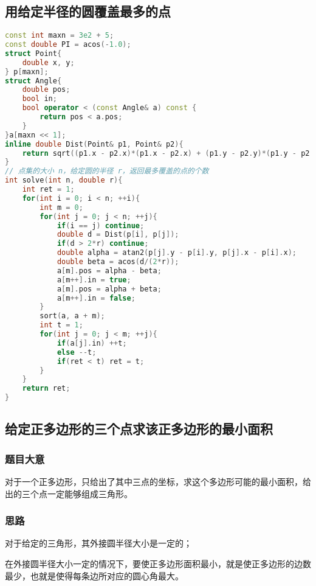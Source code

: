 \subsection{用给定半径的圆覆盖最多的点}

\begin{lstlisting}[language=C++]
const int maxn = 3e2 + 5;
const double PI = acos(-1.0);
struct Point{
    double x, y;
} p[maxn];
struct Angle{
    double pos;
    bool in;
    bool operator < (const Angle& a) const {
        return pos < a.pos;
    }
}a[maxn << 1];
inline double Dist(Point& p1, Point& p2){
    return sqrt((p1.x - p2.x)*(p1.x - p2.x) + (p1.y - p2.y)*(p1.y - p2.y));
}
// 点集的大小 n，给定圆的半径 r，返回最多覆盖的点的个数
int solve(int n, double r){
    int ret = 1;
    for(int i = 0; i < n; ++i){
        int m = 0;
        for(int j = 0; j < n; ++j){
            if(i == j) continue;
            double d = Dist(p[i], p[j]);
            if(d > 2*r) continue;
            double alpha = atan2(p[j].y - p[i].y, p[j].x - p[i].x);
            double beta = acos(d/(2*r));
            a[m].pos = alpha - beta;
            a[m++].in = true;
            a[m].pos = alpha + beta;
            a[m++].in = false;
        }
        sort(a, a + m);
        int t = 1;
        for(int j = 0; j < m; ++j){
            if(a[j].in) ++t;
            else --t;
            if(ret < t) ret = t;
        }
    }
    return ret;
}
\end{lstlisting}

\subsection{给定正多边形的三个点求该正多边形的最小面积}

\subsubsection{题目大意}

对于一个正多边形，只给出了其中三点的坐标，求这个多边形可能的最小面积，给出的三个点一定能够组成三角形。

\subsubsection{思路}

对于给定的三角形，其外接圆半径大小是一定的；

在外接圆半径大小一定的情况下，要使正多边形面积最小，就是使正多边形的边数最少，也就是使得每条边所对应的圆心角最大。

